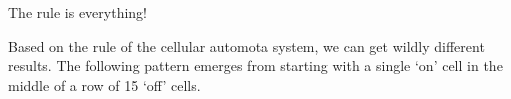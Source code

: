 \documentclass{beamer}
\begin{document}
\begin{frame}[t]{The rule is everything!}
\par{Based on the rule of the cellular automota system, we can get wildly different results. The following pattern emerges from starting with a single `on' cell in the middle of a row of 15 `off' cells.\\~\ }

\par{}
\end{frame}
\end{document}
